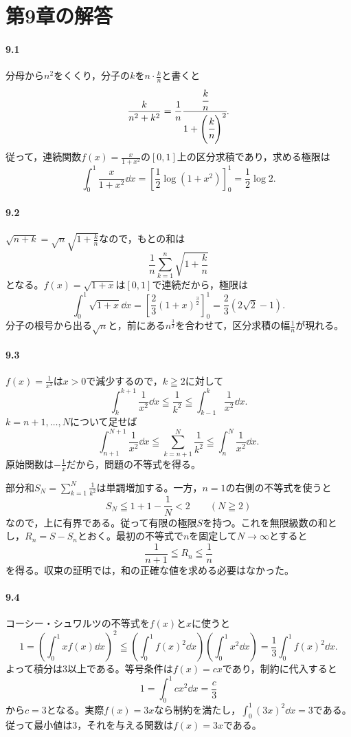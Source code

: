 \section{第9章の解答}\label{解答:第9章}

\paragraph{9.1}
分母から$n^2$をくくり，分子の$k$を$n\cdot\frac{k}{n}$と書くと
\[
 \frac{k}{n^2+k^2}
 =\frac1n\cfrac{\cfrac{k}{n}}{1+\left(\cfrac{k}{n}\right)^2}.
\]
従って，連続関数$f(x)=\frac{x}{1+x^2}$の$[0,1]$上の区分求積であり，求める極限は
\[
 \int_0^1\frac{x}{1+x^2}\dd x
 =\left[\frac12\log(1+x^2)\right]_0^1
 =\frac12\log2.
\]

\paragraph{9.2}
$\sqrt{n+k}=\sqrt n\sqrt{1+\frac{k}{n}}$なので，もとの和は
\[
 \frac1n\sum_{k=1}^{n}\sqrt{1+\frac{k}{n}}
\]
となる。$f(x)=\sqrt{1+x}$は$[0,1]$で連続だから，極限は
\[
 \int_0^1\sqrt{1+x}\dd x
 =\left[\frac23(1+x)^{\frac32}\right]_0^1
 =\frac23(2\sqrt2-1).
\]
分子の根号から出る$\sqrt n$と，前にある$n^{\frac32}$を合わせて，区分求積の幅$\frac1n$が現れる。

\paragraph{9.3}
$f(x)=\frac1{x^2}$は$x>0$で減少するので，$k\geqq2$に対して
\[
 \int_k^{k+1}\frac1{x^2}\dd x
 \leqq\frac1{k^2}
 \leqq\int_{k-1}^{k}\frac1{x^2}\dd x.
\]
$k=n+1,\ldots,N$について足せば
\[
 \int_{n+1}^{N+1}\frac1{x^2}\dd x
 \leqq\sum_{k=n+1}^{N}\frac1{k^2}
 \leqq\int_n^N\frac1{x^2}\dd x.
\]
原始関数は$-\frac1x$だから，問題の不等式を得る。

部分和$S_N=\sum_{k=1}^{N}\frac1{k^2}$は単調増加する。一方，$n=1$の右側の不等式を使うと
\[
 S_N\leqq1+1-\frac1N<2\qquad(N\geqq2)
\]
なので，上に有界である。従って有限の極限$S$を持つ。これを無限級数の和とし，$R_n=S-S_n$とおく。最初の不等式で$n$を固定して$N\to\infty$とすると
\[
 \frac1{n+1}\leqq R_n\leqq\frac1n
\]
を得る。収束の証明では，和の正確な値を求める必要はなかった。

\paragraph{9.4}
コーシー・シュワルツの不等式を$f(x)$と$x$に使うと
\[
 1=\left(\int_0^1xf(x)\dd x\right)^2
 \leqq\left(\int_0^1f(x)^2\dd x\right)
       \left(\int_0^1x^2\dd x\right)
 =\frac13\int_0^1f(x)^2\dd x.
\]
よって積分は$3$以上である。等号条件は$f(x)=cx$であり，制約に代入すると
\[
 1=\int_0^1cx^2\dd x=\frac c3
\]
から$c=3$となる。実際$f(x)=3x$なら制約を満たし，$\int_0^1(3x)^2\dd x=3$である。従って最小値は$3$，それを与える関数は$f(x)=3x$である。


